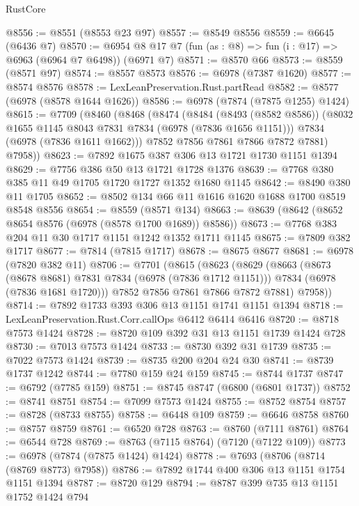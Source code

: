 \begin{lexlean}{RustCore}
\begin{coremodule}
@8556 := @8551 (@8553 @23 @97)
@8557 := @8549 @8556
@8559 := @6645 (@6436 @7)
@8570 := @6954 @8 @17 @7 (fun (as : @8) => fun (i : @17) => @6963 (@6964 @7 @6498)) (@6971 @7)
@8571 := @8570 @66
@8573 := @8559 (@8571 @97)
@8574 := @8557 @8573
@8576 := @6978 (@7387 @1620)
@8577 := @8574 @8576
@8578 := LexLeanPreservation.Rust.partRead
@8582 := @8577 (@6978 (@8578 @1644 @1626))
@8586 := @6978 (@7874 (@7875 @1255) @1424)
@8615 := @7709
    (@8460
      (@8468
        (@8474
          (@8484
            (@8493 (@8582 @8586))
            (@8032 @1655 @1145 @8043 @7831 @7834 (@6978 (@7836 @1656 @1151)))
            @7834
            (@6978 (@7836 @1611 @1662)))
          @7852
          @7856
          @7861
          @7866
          @7872
          @7881)
        @7958))
@8623 := @7892 @1675 @387 @306 @13 @1721 @1730 @1151 @1394
@8629 := @7756 @386 @50 @13 @1721 @1728 @1376
@8639 := @7768 @380 @385 @11 @49 @1705 @1720 @1727 @1352 @1680 @1145
@8642 := @8490 @380 @11 @1705
@8652 := @8502 @134 @66 @11 @1616 @1620 @1688 @1700 @8519 @8548 @8556
@8654 := @8559 (@8571 @134)
@8663 := @8639 (@8642 (@8652 @8654 @8576 (@6978 (@8578 @1700 @1689)) @8586))
@8673 := @7768 @383 @204 @11 @30 @1717 @1151 @1242 @1352 @1711 @1145
@8675 := @7809 @382 @1717
@8677 := @7814 (@7815 @1717)
@8678 := @8675 @8677
@8681 := @6978 (@7820 @382 @11)
@8706 := @7701
    (@8615
      (@8623
        (@8629
          (@8663
            (@8673 (@8678 @8681) @7831 @7834 (@6978 (@7836 @1712 @1151)))
            @7834
            (@6978 (@7836 @1681 @1720)))
          @7852
          @7856
          @7861
          @7866
          @7872
          @7881)
        @7958))
@8714 := @7892 @1733 @393 @306 @13 @1151 @1741 @1151 @1394
@8718 := LexLeanPreservation.Rust.Corr.callOps @6412 @6414 @6416
@8720 := @8718 @7573 @1424
@8728 := @8720 @109 @392 @31 @13 @1151 @1739 @1424 @728
@8730 := @7013 @7573 @1424
@8733 := @8730 @392 @31 @1739
@8735 := @7022 @7573 @1424
@8739 := @8735 @200 @204 @24 @30
@8741 := @8739 @1737 @1242
@8744 := @7780 @159 @24 @159
@8745 := @8744 @1737
@8747 := @6792 (@7785 @159)
@8751 := @8745 @8747 (@6800 (@6801 @1737))
@8752 := @8741 @8751
@8754 := @7099 @7573 @1424
@8755 := @8752 @8754
@8757 := @8728 (@8733 @8755)
@8758 := @6448 @109
@8759 := @6646 @8758
@8760 := @8757 @8759
@8761 := @6520 @728
@8763 := @8760 (@7111 @8761)
@8764 := @6544 @728
@8769 := @8763 (@7115 @8764) (@7120 (@7122 @109))
@8773 := @6978 (@7874 (@7875 @1424) @1424)
@8778 := @7693 (@8706 (@8714 (@8769 @8773) @7958))
@8786 := @7892 @1744 @400 @306 @13 @1151 @1754 @1151 @1394
@8787 := @8720 @129
@8794 := @8787 @399 @735 @13 @1151 @1752 @1424 @794

\end{coremodule}
\end{lexlean}
